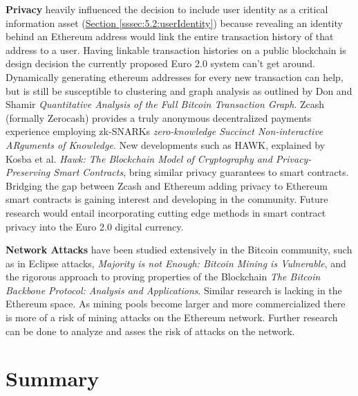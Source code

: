 \documentclass[a4paper,12pt]{article} %
\newcommand{\hypersectionref}[1]{\hyperref[#1]{Section \ref{#1}}}
\begin{document}
{\textbf{Privacy} heavily influenced the decision to include user identity as a critical information asset (\hypersectionref{sssec:5.2:userIdentity}) because revealing an identity behind an Ethereum address would link the entire transaction history of that address to a user. Having linkable transaction histories on a public blockchain is design decision the currently proposed Euro 2.0 system can't get around. Dynamically generating ethereum addresses for every new transaction can help, but is still be susceptible to clustering and graph analysis as outlined by Don and Shamir \textit{Quantitative Analysis of the Full Bitcoin Transaction Graph}\cite{Ron2013}. Zcash (formally Zerocash) provides a truly anonymous decentralized payments experience employing zk-SNARKs \textit{zero-knowledge Succinct Non-interactive ARguments of Knowledge}\cite{zerocash}. New developments such as HAWK, explained by Kosba et al. \textit{Hawk: The Blockchain Model of Cryptography and Privacy-Preserving Smart Contracts}\cite{hawk}, bring similar privacy guarantees to smart contracts. Bridging the gap between Zcash and Ethereum adding privacy to Ethereum smart contracts is gaining interest and developing in the community\cite{ZcashEtherumUpdate}\cite{zkSNARKsBlog}\cite{zkSNARKsPaper}. Future research would entail incorporating cutting edge methods in smart contract privacy into the Euro 2.0 digital currency.

\textbf{Network Attacks} have been studied extensively in the Bitcoin community, such as in Eclipse attacks\cite{EclipseAttacks}, \textit{Majority is not Enough: Bitcoin Mining is Vulnerable}\cite{MajorityIsNotEnough}, and the rigorous approach to proving properties of the Blockchain \textit{The Bitcoin Backbone Protocol: Analysis and Applications}\cite{BitcoinBackboneProtocol}. Similar research is lacking in the Ethereum space. As mining pools become larger and more commercialized there is more of a risk of mining attacks on the Ethereum network. Further research can be done to analyze and asses the risk of attacks on the network.

\pagebreak

\section{Summary} \label{sec:6}

}
\end{document}
